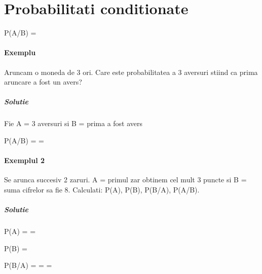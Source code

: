 \documentclass[oneside]{memoir}
\begin{document}
\section[Probabilitati conditionate]{Probabilitati conditionate}
\begin{center}
    \begin{myequation*}
P(A/B) = 
    \end{myequation*}
\end{center}

\paragraph*{Exemplu} Aruncam o moneda de 3 ori. Care este probabilitatea a 3 aversuri stiind ca prima aruncare a fost un avers?

\subparagraph*{Solutie} Fie A = 3 aversuri si B = prima a fost avers
\begin{center}
    \begin{myequation*}
P(A/B) =  = 
    \end{myequation*}
\end{center}

\paragraph*{Exemplul 2} Se arunca succesiv 2 zaruri. A = primul zar obtinem cel mult 3 puncte si B = suma cifrelor sa fie 8. Calculati: P(A), P(B), P(B/A), P(A/B).
\subparagraph*{Solutie}

\begin{center}
    \begin{myequation*}
P(A) =  = 
    \end{myequation*}
\end{center}
\begin{center}
    \begin{myequation*}
P(B) = 
    \end{myequation*}
\end{center}
\begin{center}
    \begin{myequation*}
P(B/A) =  =  = 
    \end{myequation*}
\end{center}
\end{document}
